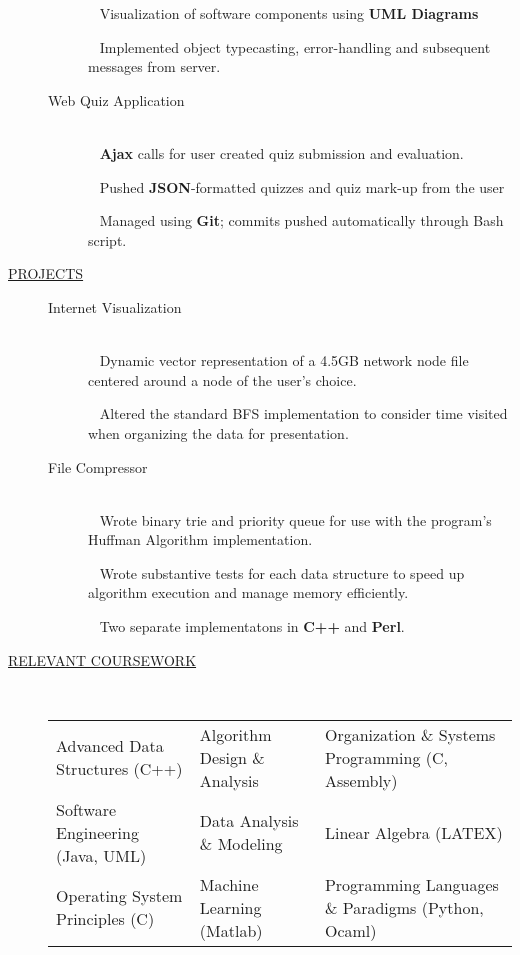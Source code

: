 \documentclass{article}
\begin{document}
\begin{description}
\begin{description}
            \textbullet ~ Visualization of software components using {\bf UML Diagrams}

            \textbullet ~ Implemented object typecasting, error-handling and subsequent messages from server.

		\item[Web Quiz Application] \hfill \\
            \textbullet ~ {\bf Ajax} calls for user created quiz submission and evaluation.

            \textbullet ~ Pushed {\bf JSON}-formatted quizzes and quiz mark-up from the user

            \textbullet ~ Managed using {\bf Git}; commits pushed automatically through Bash script.

        \end{description}


    \item[\underline{PROJECTS}] \hfill
        \begin{description}
        \item[Internet Visualization] \hfill \\
		    \textbullet ~ Dynamic vector representation of a 4.5GB network node file centered around a
            node of the user's choice.

            \textbullet ~ Altered the standard BFS implementation to consider time visited when
            organizing the data for presentation.

		\item[File Compressor] \hfill \\
            \textbullet ~ Wrote binary trie and priority queue for use with the program's Huffman Algorithm implementation.

            \textbullet ~ Wrote substantive tests for each data
                structure to speed up algorithm execution and manage memory efficiently.

            \textbullet ~ Two separate implementatons in {\bf C++} and {\bf Perl}.

		\end{description}

    \fi
    \item[\underline{RELEVANT COURSEWORK}]\hfill \\

        \begin{tabular}{l|l|l}
            Advanced Data Structures (C++)& Algorithm Design \& Analysis & Organization \& Systems Programming (C, Assembly)\\
         Software Engineering (Java, UML) & Data Analysis \& Modeling & Linear Algebra (LATEX) \\
              Operating System Principles (C) & Machine Learning (Matlab) & Programming Languages \& Paradigms (Python, Ocaml) \\
        \end{tabular}


\end{description}
\end{document}
